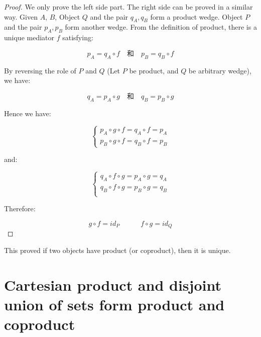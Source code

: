 \documentclass[UTF8]{article}
\begin{document}
\begin{proof}
We only prove the left side part. The right side can be proved in a similar way. Given $A$, $B$, Object $Q$ and the pair $q_A, q_B$ form a product wedge. Object $P$ and the pair $p_A, p_B$ form another wedge. From the definition of product, there is a unique mediator $f$ satisfying:

\[
p_A = q_A \circ f \quad \text{和} \quad p_B = q_B \circ f
\]

By reversing the role of $P$ and $Q$ (Let $P$ be product, and $Q$ be arbitrary wedge), we have:

\[
q_A = p_A \circ g \quad \text{和} \quad q_B = p_B \circ g
\]

Hence we have:

\[
\begin{cases}
p_A \circ g \circ f = q_A \circ f = p_A \\
p_B \circ g \circ f = q_B \circ f = p_B
\end{cases}
\]

and:

\[
\begin{cases}
q_A \circ f \circ g = p_A \circ g = q_A \\
q_B \circ f \circ g = p_B \circ g = q_B \\
\end{cases}
\]

Therefore:

\[
g \circ f = id_P \quad \quad \quad f \circ g = id_Q
\]

\end{proof}

This proved if two objects have product (or coproduct), then it is unique.

\chapter*{Cartesian product and disjoint union of sets form product and coproduct}
\end{document}
